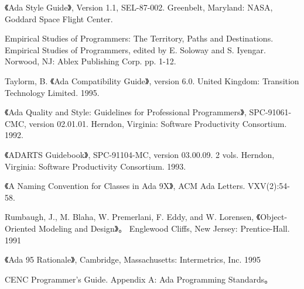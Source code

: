 \begin{thebibliography}{widest-label}
 《Ada Style Guide》, Version 1.1, SEL-87-002. Greenbelt, Maryland: NASA, Goddard Space Flight Center.

 Empirical Studies of Programmers:
The Territory, Paths and Destinations. Empirical Studies of Programmers, edited by E. Soloway and S. Iyengar. Norwood, NJ: Ablex Publishing Corp. pp. 1-12.

 Taylorm, B.
《Ada Compatibility Guide》, version 6.0. United Kingdom:
Transition Technology Limited. 1995.


 《Ada Quality and Style: Guidelines
for Professional Programmers》, SPC-91061-CMC, version 02.01.01.
Herndon, Virginia: Software Productivity Consortium. 1992.

 《ADARTS Guidebook》, SPC-91104-MC,
version 03.00.09. 2 vols. Herndon, Virginia: Software Productivity Consortium.
1993.

 《A Naming Convention for Classes in Ada 9X》, ACM Ada Letters. VXV(2):54-58.

 Rumbaugh, J., M. Blaha, W. Premerlani, F. Eddy, and W. Lorensen, 《Object-Oriented Modeling and Design》。
Englewood Cliffs, New Jersey: Prentice-Hall. 1991

 《Ada 95 Rationale》, Cambridge,
Massachusetts: Intermetrics, Inc. 1995

 CENC Programmer's Guide. Appendix A: Ada Programming Standards。

\end{thebibliography}
